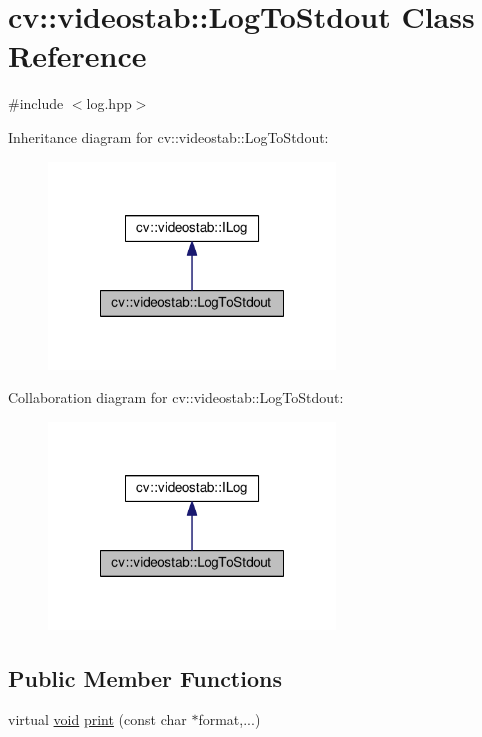 \hypertarget{classcv_1_1videostab_1_1LogToStdout}{\section{cv\-:\-:videostab\-:\-:Log\-To\-Stdout Class Reference}
\label{classcv_1_1videostab_1_1LogToStdout}
}


{\ttfamily \#include $<$log.\-hpp$>$}



Inheritance diagram for cv\-:\-:videostab\-:\-:Log\-To\-Stdout\-:\nopagebreak
\begin{figure}[H]
\begin{center}
\leavevmode
\includegraphics[width=216pt]{classcv_1_1videostab_1_1LogToStdout__inherit__graph}
\end{center}
\end{figure}


Collaboration diagram for cv\-:\-:videostab\-:\-:Log\-To\-Stdout\-:\nopagebreak
\begin{figure}[H]
\begin{center}
\leavevmode
\includegraphics[width=216pt]{classcv_1_1videostab_1_1LogToStdout__coll__graph}
\end{center}
\end{figure}
\subsection*{Public Member Functions}
\begin{DoxyCompactItemize}
\item 
virtual \hyperlink{legacy_8hpp_a8bb47f092d473522721002c86c13b94e}{void} \hyperlink{classcv_1_1videostab_1_1LogToStdout_ab58a03dbe0715f2916a56f12b2cd1ad9}{print} (const char $\ast$format,...)
\end{DoxyCompactItemize}



